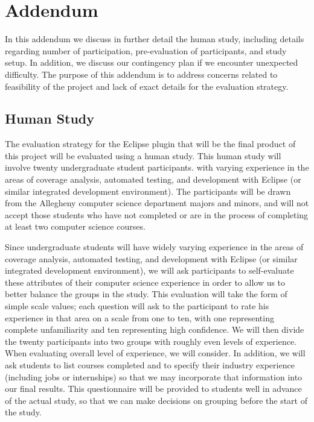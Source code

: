 %
%

\chapter{Addendum}\label{appb:add}


In this addendum we discuss in further detail the human study, including
details regarding number of participation, pre-evaluation of participants,
and study setup.  In addition, we discuss our contingency plan if we
encounter unexpected difficulty.  The purpose of this addendum is to address
concerns related to feasibility of the project and lack of exact details for
the evaluation strategy.

\section{Human Study}\label{sec:addhs}

The evaluation strategy for the Eclipse plugin that will be the final product
of this project will be evaluated using a human study.  This human study will
involve twenty undergraduate student participants. with varying experience in
the areas of coverage analysis, automated testing, and development with Eclipse
(or similar integrated development environment).  The participants will be drawn 
from the Allegheny computer science department majors and minors, and will not
accept those students who have not completed or are in the process of completing
at least two computer science courses.

Since undergraduate students will have widely varying experience in
the areas of coverage analysis, automated testing, and development with Eclipse
(or similar integrated development environment), we will ask participants
to self-evaluate these attributes of their computer science experience in order
to allow us to better balance the groups in the study.  This evaluation will
take the form of simple scale values; each question will ask to the participant
to rate his experience in that area on a scale from one to ten, with one representing
complete unfamiliarity and ten representing high confidence.  We will then divide
the twenty participants into two groups with roughly even levels of experience.  
When evaluating overall level of experience, we will consider.  In addition,
we will ask students to list courses completed and to specify their industry
experience (including jobs or internships) so that we may incorporate that information
into our final results.  This questionnaire will be provided to students well in advance
of the actual study, so that we can make decisions on grouping before the start of
the study.

